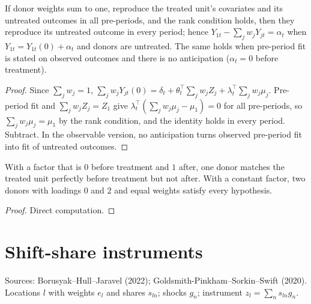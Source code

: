 \begin{theorem}
\label{thm:synth}
\leanok
{}
If donor weights sum to one, reproduce the treated unit's covariates and its untreated outcomes in all pre-periods, and
the rank condition holds, then they reproduce its untreated outcome in every period; hence
$Y_{1t} - \sum_jw_jY_{jt} = \alpha_t$ when $Y_{1t} = Y_{1t}(0)+\alpha_t$ and donors are untreated. The same holds when
pre-period fit is stated on observed outcomes and there is no anticipation ($\alpha_t = 0$ before treatment).
\end{theorem}
\begin{proof}
\leanok
Since $\sum_jw_j = 1$, $\sum_jw_jY_{jt}(0) = \delta_t + \theta_t^\top\sum_jw_jZ_j + \lambda_t^\top\sum_jw_j\mu_j$.
Pre-period fit and $\sum_jw_jZ_j = Z_1$ give $\lambda_t^\top(\sum_jw_j\mu_j - \mu_1) = 0$ for all pre-periods, so
$\sum_jw_j\mu_j = \mu_1$ by the rank condition, and the identity holds in every period. Subtract. In the observable
version, no anticipation turns observed pre-period fit into fit of untreated outcomes.
\end{proof}

\begin{proposition}
\label{prop:synth-examples}
\leanok
{}
With a factor that is $0$ before treatment and $1$ after, one donor matches the treated unit perfectly before treatment
but not after. With a constant factor, two donors with loadings $0$ and $2$ and equal weights satisfy every hypothesis.
\end{proposition}
\begin{proof}
\leanok
Direct computation.
\end{proof}

\section{Shift-share instruments}
\label{sec:shift-share}

Sources: Borusyak--Hull--Jaravel (2022); Goldsmith-Pinkham--Sorkin--Swift (2020). Locations $l$ with weights $e_l$ and
shares $s_{ln}$; shocks $g_n$; instrument $z_l = \sum_ns_{ln}g_n$.

